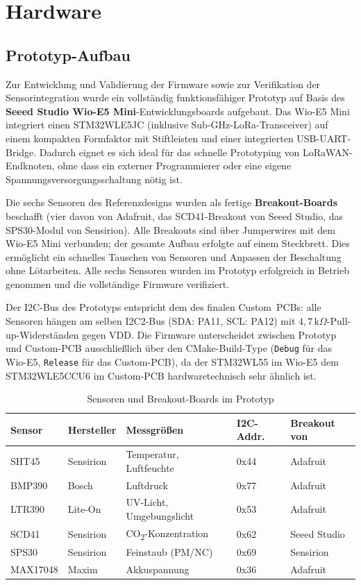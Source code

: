 \chapter{Hardware}
\label{cha:hardware}

\section*{Prototyp-Aufbau}

Zur Entwicklung und Validierung der Firmware sowie zur Verifikation der Sensorintegration wurde ein vollständig funktionsfähiger Prototyp auf Basis des \textbf{Seeed Studio Wio-E5 Mini}-Entwicklungsboards aufgebaut. Das Wio-E5 Mini integriert einen STM32WLE5JC (inklusive Sub-GHz-LoRa-Transceiver) auf einem kompakten Formfaktor mit Stiftleisten und einer integrierten USB-UART-Bridge. Dadurch eignet es sich ideal für das schnelle Prototyping von LoRaWAN-Endknoten, ohne dass ein externer Programmierer oder eine eigene Spannungsversorgungsschaltung nötig ist.

Die sechs Sensoren des Referenzdesigns wurden als fertige \textbf{Breakout-Boards} beschafft (vier davon von Adafruit, das SCD41-Breakout von Seeed Studio, das SPS30-Modul von Sensirion). Alle Breakouts sind über Jumperwires mit dem Wio-E5 Mini verbunden; der gesamte Aufbau erfolgte auf einem Steckbrett. Dies ermöglicht ein schnelles Tauschen von Sensoren und Anpassen der Beschaltung ohne Lötarbeiten. Alle sechs Sensoren wurden im Prototyp erfolgreich in Betrieb genommen und die vollständige Firmware verifiziert.

Der I2C-Bus des Prototyps entspricht dem des finalen Custom~PCBs: alle Sensoren hängen am selben I2C2-Bus (SDA: PA11, SCL: PA12) mit $4{,}7\,\text{k}\Omega$-Pull-up-Widerständen gegen VDD. Die Firmware unterscheidet zwischen Prototyp und Custom-PCB ausschließlich über den CMake-Build-Type (\texttt{Debug} für das Wio-E5, \texttt{Release} für das Custom-PCB), da der STM32WL55 im Wio-E5 dem STM32WLE5CCU6 im Custom-PCB hardwaretechnisch sehr ähnlich ist.

\begin{table}[H]
  \centering
  \begin{tabular}{lllll}
    \hline
    \textbf{Sensor} & \textbf{Hersteller} & \textbf{Messgrößen} & \textbf{I2C-Addr.} & \textbf{Breakout von} \\
    \hline
    SHT45    & Sensirion & Temperatur, Luftfeuchte & 0x44 & Adafruit \\
    BMP390   & Bosch     & Luftdruck               & 0x77 & Adafruit \\
    LTR390   & Lite-On   & UV-Licht, Umgebungslicht & 0x53 & Adafruit \\
    SCD41    & Sensirion & CO\textsubscript{2}-Konzentration & 0x62 & Seeed Studio \\
    SPS30    & Sensirion & Feinstaub (PM/NC)        & 0x69 & Sensirion \\
    MAX17048 & Maxim     & Akkuspannung             & 0x36 & Adafruit \\
    \hline
  \end{tabular}
  \caption{Sensoren und Breakout-Boards im Prototyp}
  \label{tab:breakouts}
\end{table}

